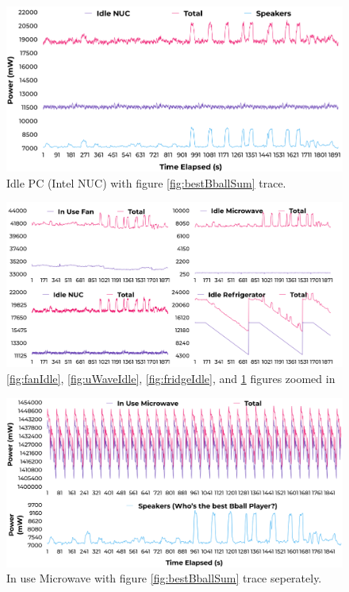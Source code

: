 \begin{figure}[H]
  \centering
  \includegraphics[width=1\textwidth]{figures/idleIntelNUCNoise.png}
  \caption{Idle PC (Intel NUC) with figure \ref{fig:bestBballSum} trace.}
  \label{fig:nucIdle}
\end{figure}

\begin{figure}[H]
    \centering
    \includegraphics[width=1\textwidth]{figures/allIdleNoise.png}
    \caption{\ref{fig:fanIdle}, \ref{fig:uWaveIdle}, \ref{fig:fridgeIdle}, and \ref{fig:nucIdle} figures zoomed in}
    \label{fig:allIdleNoise}
  \end{figure}

\begin{figure}[H]
  \centering
  \includegraphics[width=1\textwidth]{figures/inUseuWaveNoiseSeperate.png}
  \caption{In use Microwave with figure \ref{fig:bestBballSum} trace seperately.}
  \label{fig:uWaveInUseSeperate}
\end{figure}

